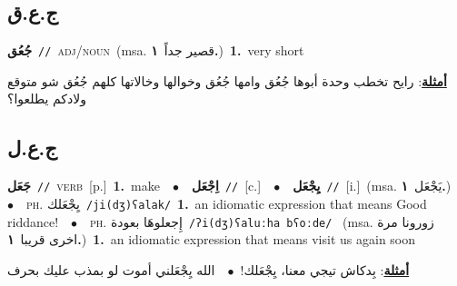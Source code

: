 \documentclass[10pt,a4paper,twoside]{article} %
\begin{document}
\begin{multicols}{2}
\vspace{-3mm}
\subsection*{\color{blue}\foreignlanguage{arabic}{ج.ع.ق}\color{blue}{}} 

{\setlength\topsep{0pt}\textbf{\foreignlanguage{arabic}{جُعُق}}\ {\color{gray}\texttt{//}\color{black}}\ \textsc{adj/noun}\ \color{gray}(msa. \foreignlanguage{arabic}{قصير جداً}~\foreignlanguage{arabic}{\textbf{١.}})\color{black}\ \textbf{1.}~very short\  \begin{flushright}\color{gray}\foreignlanguage{arabic}{\textbf{\underline{\foreignlanguage{arabic}{أمثلة}}}: رايح تخطب وحدة أبوها جُعُق وامها جُعُق وخوالها وخالاتها كلهم جُعُق شو متوقع ولادكم يطلعوا؟}\end{flushright}\color{black}} \vspace{2mm}

\vspace{-3mm}
\subsection*{\color{blue}\foreignlanguage{arabic}{ج.ع.ل}\color{blue}{}} 

{\setlength\topsep{0pt}\textbf{\foreignlanguage{arabic}{جَعَل}}\ {\color{gray}\texttt{//}\color{black}}\ \textsc{verb}\ [p.]\ \textbf{1.}~make\ \ $\bullet$\ \ \setlength\topsep{0pt}\textbf{\foreignlanguage{arabic}{اِجْعَل}}\ {\color{gray}\texttt{//}\color{black}}\ [c.]\ \ $\bullet$\ \ \setlength\topsep{0pt}\textbf{\foreignlanguage{arabic}{يِجْعَل}}\ {\color{gray}\texttt{//}\color{black}}\ [i.]\ \color{gray}(msa. \foreignlanguage{arabic}{يَجْعَل}~\foreignlanguage{arabic}{\textbf{١.}})\color{black}\ \ $\bullet$\ \ \textsc{ph.} \color{gray} \foreignlanguage{arabic}{يِجْعَلك}\color{black}\ {\color{gray}\texttt{/{\sffamily ji(dʒ)ʕalak}/}\color{black}}\ \textbf{1.}~an idiomatic expression that means Good riddance!\ \ $\bullet$\ \ \textsc{ph.} \color{gray} \foreignlanguage{arabic}{إِجعلوهَا بعودة}\color{black}\ {\color{gray}\texttt{/{\sffamily ʔi(dʒ)ʕaluːha bʕoːde}/}\color{black}}\ \color{gray} (msa. \foreignlanguage{arabic}{زورونا مرة اخرى قريبا}~\foreignlanguage{arabic}{\textbf{١.}})\color{black}\ \textbf{1.}~an idiomatic expression that means visit us again soon\  \begin{flushright}\color{gray}\foreignlanguage{arabic}{\textbf{\underline{\foreignlanguage{arabic}{أمثلة}}}: بِدكاش تيجي معنا، يِجْعَلك!\ $\bullet$\ \  الله يِجْعَلني أموت لو بمذب عليك بحرف}\end{flushright}\color{black}} \vspace{2mm}


\end{multicols}
\end{document}
